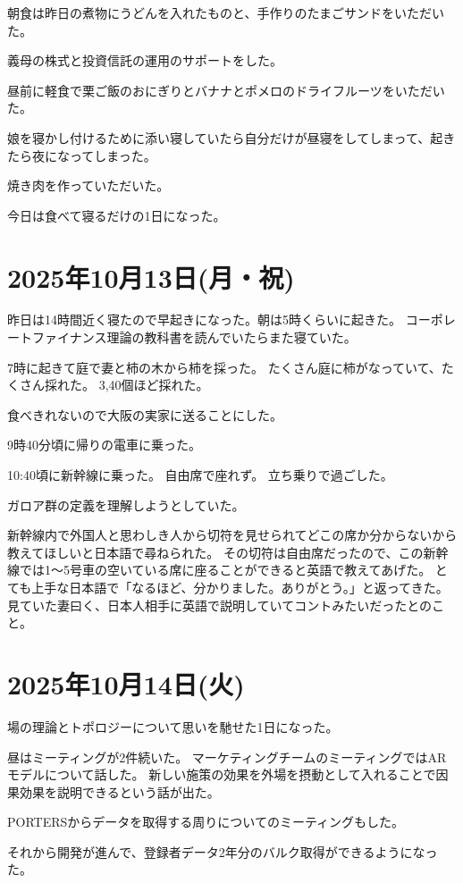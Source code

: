 \documentclass[uplatex]{jsarticle}
\begin{document}
朝食は昨日の煮物にうどんを入れたものと、手作りのたまごサンドをいただいた。

義母の株式と投資信託の運用のサポートをした。

昼前に軽食で栗ご飯のおにぎりとバナナとポメロのドライフルーツをいただいた。

娘を寝かし付けるために添い寝していたら自分だけが昼寝をしてしまって、起きたら夜になってしまった。

焼き肉を作っていただいた。

今日は食べて寝るだけの1日になった。

\section{2025年10月13日(月・祝)}

昨日は14時間近く寝たので早起きになった。朝は5時くらいに起きた。
コーポレートファイナンス理論の教科書を読んでいたらまた寝ていた。

7時に起きて庭で妻と柿の木から柿を採った。
たくさん庭に柿がなっていて、たくさん採れた。
3,40個ほど採れた。

食べきれないので大阪の実家に送ることにした。

9時40分頃に帰りの電車に乗った。

10:40頃に新幹線に乗った。
自由席で座れず。
立ち乗りで過ごした。

ガロア群の定義を理解しようとしていた。

新幹線内で外国人と思わしき人から切符を見せられてどこの席か分からないから教えてほしいと日本語で尋ねられた。
その切符は自由席だったので、この新幹線では1〜5号車の空いている席に座ることができると英語で教えてあげた。
とても上手な日本語で「なるほど、分かりました。ありがとう。」と返ってきた。
見ていた妻曰く、日本人相手に英語で説明していてコントみたいだったとのこと。

\section{2025年10月14日(火)}

場の理論とトポロジーについて思いを馳せた1日になった。

昼はミーティングが2件続いた。
マーケティングチームのミーティングではARモデルについて話した。
新しい施策の効果を外場を摂動として入れることで因果効果を説明できるという話が出た。

PORTERSからデータを取得する周りについてのミーティングもした。

それから開発が進んで、登録者データ2年分のバルク取得ができるようになった。
\end{document}
